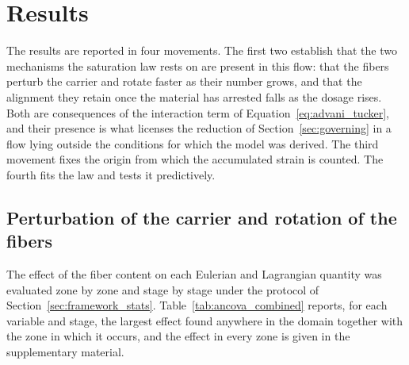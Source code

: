 \documentclass[%
  aip,
  pof,          %
  reprint,      %
  floatfix
]{revtex4-2}
\begin{document}
\section{Results}
\label{sec:results}

The results are reported in four movements. The first two establish that the two mechanisms the saturation law rests on are present in this flow: that the fibers perturb the carrier and rotate faster as their number grows, and that the alignment they retain once the material has arrested falls as the dosage rises. Both are consequences of the interaction term of Equation~\eqref{eq:advani_tucker}, and their presence is what licenses the reduction of Section~\ref{sec:governing} in a flow lying outside the conditions for which the model was derived. The third movement fixes the origin from which the accumulated strain is counted. The fourth fits the law and tests it predictively.

\subsection{Perturbation of the carrier and rotation of the fibers}
\label{sec:results_kinematics}

The effect of the fiber content on each Eulerian and Lagrangian quantity was evaluated zone by zone and stage by stage under the protocol of Section~\ref{sec:framework_stats}. Table~\ref{tab:ancova_combined} reports, for each variable and stage, the largest effect found anywhere in the domain together with the zone in which it occurs, and the effect in every zone is given in the supplementary material.
\end{document}
